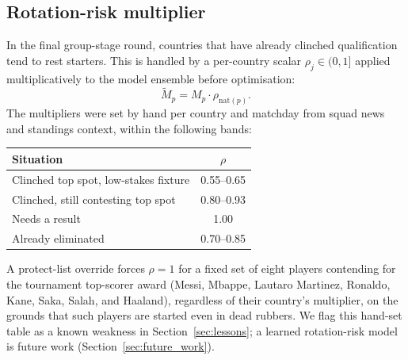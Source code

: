 \subsection{Rotation-risk multiplier}
\label{sec:appendix-b-rotation}

In the final group-stage round, countries that have already clinched
qualification tend to rest starters. This is handled by a per-country
scalar $\rho_j \in (0, 1]$ applied multiplicatively to the model
ensemble before optimisation:
\begin{equation}
\tilde{M}_p = M_p \cdot \rho_{\mathrm{nat}(p)}.
\end{equation}
The multipliers were set by hand per country and matchday from squad
news and standings context, within the following bands:

\begin{center}
\begin{tabular}{lc}
\toprule
Situation & $\rho$ \\
\midrule
Clinched top spot, low-stakes fixture & 0.55--0.65 \\
Clinched, still contesting top spot   & 0.80--0.93 \\
Needs a result                        & 1.00 \\
Already eliminated                    & 0.70--0.85 \\
\bottomrule
\end{tabular}
\end{center}

A protect-list override forces $\rho = 1$ for a fixed set of eight
players contending for the tournament top-scorer award (Messi,
Mbappe, Lautaro Martinez, Ronaldo, Kane, Saka, Salah, and Haaland),
regardless of their country's multiplier, on the grounds that such
players are started even in dead rubbers. We flag this hand-set table
as a known weakness in Section~\ref{sec:lessons}; a learned
rotation-risk model is future work
(Section~\ref{sec:future_work}).
